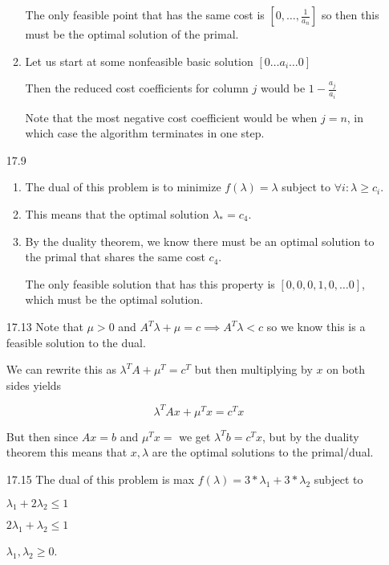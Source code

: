 \documentclass[10pt,a4paper]{article}
\begin{document}
\begin{enumerate}
\begin{enumerate}
        The only feasible point that has the same cost is $[0, \ldots, \frac{1}{a_n}]$ so then this must be the optimal solution of the primal.

        \item Let us start at some nonfeasible basic solution $[0 \ldots a_i \ldots 0]$
        
        Then the reduced cost coefficients for column $j$ would be $1 - \frac{a_j}{a_i}$

        Note that the most negative cost coefficient would be when $j=n$, in which case the algorithm terminates in one step. 

    \end{enumerate}

    \item [17.9] \begin{enumerate}
        \item The dual of this problem is to minimize $f(\lambda) = \lambda$ subject to $\forall i : \lambda \geq c_i$.
        \item This means that the optimal solution $\lambda_* = c_4$.
        \item By the duality theorem, we know there must be an optimal solution to the primal that shares the same cost $c_4$. 
        
        The only feasible solution that has this property is $[0, 0, 0, 1, 0, \ldots 0]$, which must be the optimal solution. 
    \end{enumerate}
    
    \item [17.13] Note that $\mu > 0 $ and $A^T\lambda  + \mu = c \implies A^T\lambda  < c$ so we know this is a feasible solution to the dual. 
    
    We can rewrite this as $\lambda^T A + \mu^T = c^T$ but then multiplying by $x$ on both sides yields

    $$\lambda^T Ax + \mu^Tx = c^Tx$$

    But then since $Ax=b$ and $\mu^Tx = $ we get $\lambda^Tb = c^Tx$, but by the duality theorem this means that $x, \lambda$ are the optimal solutions to the primal/dual.

    \item [17.15] The dual of this problem is max $f(\lambda) = 3*\lambda_1 + 3*\lambda_2$ subject to 

    $\lambda_1 + 2\lambda_2 \leq 1$

    $2\lambda_1 + \lambda_2 \leq 1$

    $\lambda_1, \lambda_2 \geq 0$.


\end{enumerate}
\end{document}
